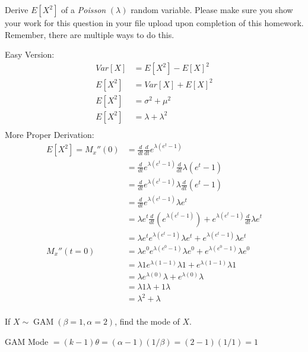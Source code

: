 \documentclass[answers]{exam}
\begin{document}
\begin{questions}
\question 
Derive \(E[X^2]\) of a \emph{Poisson} \((\lambda)\) random variable. Please make sure you show your work for this question in your file upload upon completion of this homework. Remember, there are multiple ways to do this.
\begin{solution}
	Easy Version:
	\begin{align*}
		Var[X] &= E[X^2] - E[X]^2 \\
		E[X^2] &= Var[X] + E[X]^2 \\
		E[X^2] &= \sigma^2 + \mu^2 \\
		E[X^2] &= \lambda + \lambda^2 \\
	\end{align*}
	More Proper Derivation:
	\begin{align*}
		E[X^2] = M_x''(0) 
		&= \frac{d}{dt}\frac{d}{dt} e^{\lambda(e^t-1)} \\
		&= \frac{d}{dt} e^{\lambda(e^t-1)} \frac{d}{dt} \lambda(e^t-1) \\
		&= \frac{d}{dt} e^{\lambda(e^t-1)} \lambda \frac{d}{dt} (e^t-1) \\
		&= \frac{d}{dt} e^{\lambda(e^t-1)} \lambda e^t \\
		&= \lambda e^t \frac{d}{dt}(e^{\lambda(e^t-1)}) 
		 + e^{\lambda(e^t-1)} \frac{d}{dt}\lambda e^t \\
		&= \lambda e^t e^{\lambda(e^t-1)} \lambda e^t
		 + e^{\lambda(e^t-1)} \lambda e^t \\
		M_x''(t=0)
		&= \lambda e^0 e^{\lambda(e^0-1)} \lambda e^0
		+ e^{\lambda(e^0-1)} \lambda e^0 \\ 
		&= \lambda 1 e^{\lambda(1-1)} \lambda 1
		+ e^{\lambda(1-1)} \lambda 1 \\ 
		&= \lambda e^{\lambda(0)} \lambda + e^{\lambda(0)} \lambda \\
		&= \lambda 1 \lambda + 1 \lambda \\ 
		&= \lambda^2 + \lambda \\   
	\end{align*}
\end{solution}

\question 
If \(X\sim\operatorname{GAM}(\beta=1,\alpha=2)\), find the mode of $X$.
\begin{solution}
	GAM Mode \(= (k-1)\theta = (\alpha - 1)(1/\beta) = (2-1)(1/1) = 1\)
\end{solution}


\end{questions}
\end{document}
